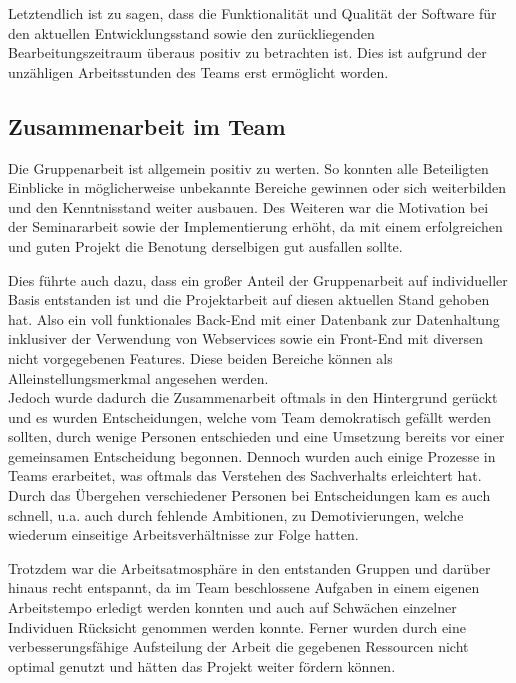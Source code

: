 Letztendlich ist zu sagen, dass die Funktionalität und Qualität der Software für den aktuellen Entwicklungsstand sowie den zurückliegenden Bearbeitungszeitraum überaus positiv zu betrachten ist.
Dies ist aufgrund der unzähligen Arbeitsstunden des Teams erst ermöglicht worden.

\subsection{Zusammenarbeit im Team}

Die Gruppenarbeit ist allgemein positiv zu werten.
So konnten alle Beteiligten Einblicke in möglicherweise unbekannte Bereiche gewinnen oder sich weiterbilden und den Kenntnisstand weiter ausbauen.
Des Weiteren war die Motivation bei der Seminararbeit sowie der Implementierung erhöht, da mit einem erfolgreichen und guten Projekt die Benotung derselbigen gut ausfallen sollte.

Dies führte auch dazu, dass ein großer Anteil der Gruppenarbeit auf individueller Basis entstanden ist und die Projektarbeit auf diesen aktuellen Stand gehoben hat.
Also ein voll funktionales Back-End mit einer Datenbank zur Datenhaltung inklusiver der Verwendung von Webservices sowie ein Front-End mit diversen nicht vorgegebenen Features.
Diese beiden Bereiche können als Alleinstellungsmerkmal angesehen werden.\\
Jedoch wurde dadurch die Zusammenarbeit oftmals in den Hintergrund gerückt und es wurden Entscheidungen, welche vom Team demokratisch gefällt werden sollten, durch wenige Personen entschieden und eine Umsetzung bereits vor einer gemeinsamen Entscheidung begonnen.
Dennoch wurden auch einige Prozesse in Teams erarbeitet, was oftmals das Verstehen des Sachverhalts erleichtert hat.
Durch das Übergehen verschiedener Personen bei Entscheidungen kam es auch schnell, u.a. auch durch fehlende Ambitionen, zu Demotivierungen, welche wiederum einseitige Arbeitsverhältnisse zur Folge hatten.

Trotzdem war die Arbeitsatmosphäre in den entstanden Gruppen und darüber hinaus recht entspannt, da im Team beschlossene Aufgaben in einem eigenen Arbeitstempo erledigt werden konnten und auch auf Schwächen einzelner Individuen Rücksicht genommen werden konnte.
Ferner wurden durch eine verbesserungsfähige Aufsteilung der Arbeit die gegebenen Ressourcen nicht optimal genutzt und hätten das Projekt weiter fördern können.

